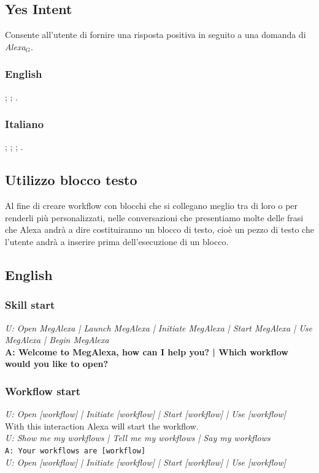 \subsection{Yes Intent}
Consente all'utente di fornire una risposta positiva in seguito a una domanda di \textit{Alexa$_{G}$}.
\subsubsection{English}
\begin{itemize}
	
	;
	;
	.
	
\end{itemize}

\subsubsection{Italiano}
\begin{itemize}
	;
	;
	;
	.		
\end{itemize}

\subsection{Utilizzo blocco testo}
Al fine di creare workflow con blocchi che si collegano meglio tra di loro o per renderli più personalizzati,
nelle conversazioni che presentiamo molte delle frasi che Alexa andrà a dire costituiranno un blocco di testo, cioè un pezzo di testo che l'utente andrà a inserire prima dell'esecuzione di un blocco.

\subsection{English}
\subsubsection{Skill start} \label{SkillStart}
\textit{U: Open MegAlexa | Launch MegAlexa | Initiate MegAlexa | Start MegAlexa | Use MegAlexa | Begin MegAlexa}\\
\textbf{A: Welcome to MegAlexa, how can I help you? | Which workflow would you like to open?}

\subsubsection{Workflow start}
\textit{U: Open [workflow] | Initiate [workflow] | Start [workflow] | Use [workflow]}\\
With this interaction Alexa will start the workflow. \\
\textit{U: Show me my workflows | Tell me my workflows | Say my workflows}\\
\texttt{A: Your workflows are [workflow]}\\
\textit{U: Open [workflow] | Initiate [workflow] | Start [workflow] | Use [workflow]}

